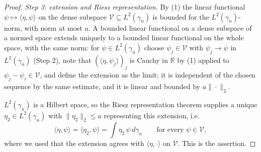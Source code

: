 \begin{proof}
\emph{Step 3: extension and Riesz representation.}
By (1) the linear functional $\psi \mapsto \langle\eta,\psi\rangle$ on the dense
subspace $\mathcal{V} \subseteq L^2(\gamma_n)$ is bounded for the
$L^2(\gamma_n)$-norm, with norm at most $a$.  A bounded linear functional on a
dense subspace of a normed space extends uniquely to a bounded linear functional
on the whole space, with the same norm: for $\psi \in L^2(\gamma_n)$ choose
$\psi_j \in \mathcal{V}$ with $\psi_j \to \psi$ in $L^2(\gamma_n)$ (Step 2), note
that $(\langle\eta,\psi_j\rangle)_j$ is Cauchy in $\mathbb{R}$ by (1) applied to
$\psi_j - \psi_i \in \mathcal{V}$, and define the extension as the limit; it is
independent of the chosen sequence by the same estimate, and it is linear and
bounded by $a\|\cdot\|_2$.

$L^2(\gamma_n)$ is a Hilbert space, so the Riesz representation theorem supplies a
unique $\eta_2 \in L^2(\gamma_n)$ with $\|\eta_2\|_2 \leq a$ representing this
extension, i.e.
\[
  \langle\eta,\psi\rangle = \langle \eta_2, \psi\rangle = \int \eta_2\,\psi\, d\gamma_n
  \qquad\text{for every } \psi \in \mathcal{V} ,
\]
where we used that the extension agrees with $\langle\eta,\cdot\rangle$ on
$\mathcal{V}$.  This is the assertion.
\end{proof}

